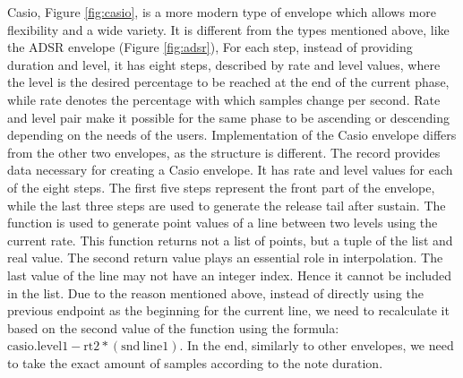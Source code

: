 \documentclass[runningheads]{llncs}
\begin{document}
Casio, Figure \ref{fig:casio}, is a more modern type of envelope which allows more flexibility and a wide variety. It is different from the types mentioned above, like the ADSR envelope (Figure \ref{fig:adsr}), For each step, instead of providing duration and level, it has eight steps, described by rate and level values, where the level is the desired percentage to be reached at the end of the current phase, while rate denotes the percentage with which samples change per second. Rate and level pair make it possible for the same phase to be ascending or descending depending on the needs of the users. Implementation of the Casio envelope differs from the other two envelopes, as the structure is different. The  record provides data necessary for creating a Casio envelope. It has rate and level values for each of the eight steps. The first five steps represent the front part of the envelope, while the last three steps are used to generate the release tail after sustain. The  function is used to generate point values of a line between two levels using the current rate. This function returns not a list of points, but a tuple of the list and real value. The second return value plays an essential role in interpolation. The last value of the line may not have an integer index. Hence it cannot be included in the list. Due to the reason mentioned above, instead of directly using the previous endpoint as the beginning for the current line, we need to recalculate it based on the second value of the  function using the formula: \(\mathrm{casio.level1-rt2*(snd\ line1)}\). In the end, similarly to other envelopes, we need to take the exact amount of samples according to the note duration.
\end{document}
